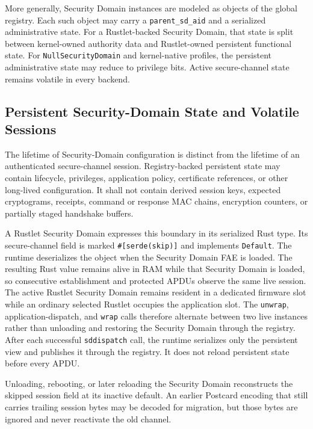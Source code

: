 More generally, Security Domain instances are modeled as objects of the global
registry. Each such object may carry a \texttt{parent\_sd\_aid} and a
serialized administrative state. For a Rustlet-backed Security Domain, that
state is split between kernel-owned authority data and Rustlet-owned persistent
functional state. For \texttt{NullSecurityDomain} and kernel-native profiles,
the persistent administrative state may reduce to privilege bits. Active
secure-channel state remains volatile in every backend.

\subsection{Persistent Security-Domain State and Volatile Sessions}
\label{sec:impl-scp-state-lifetime}

The lifetime of Security-Domain configuration is distinct from the lifetime of
an authenticated secure-channel session. Registry-backed persistent state may
contain lifecycle, privileges, application policy, certificate references, or
other long-lived configuration. It shall not contain derived session keys,
expected cryptograms, receipts, command or response MAC chains, encryption
counters, or partially staged handshake buffers.

A Rustlet Security Domain expresses this boundary in its serialized Rust type.
Its secure-channel field is marked \texttt{\#[serde(skip)]} and implements
\texttt{Default}. The runtime deserializes the object when the Security Domain
FAE is loaded. The resulting Rust value remains alive in RAM while that
Security Domain is loaded, so consecutive establishment and protected APDUs
observe the same live session. The active Rustlet Security Domain remains
resident in a dedicated firmware slot while an ordinary selected Rustlet
occupies the application slot. The \texttt{unwrap}, application-dispatch, and
\texttt{wrap} calls therefore alternate between two live instances rather than
unloading and restoring the Security Domain through the registry. After each
successful \texttt{sddispatch} call, the runtime serializes only the persistent
view and publishes it through the registry. It does not reload persistent state
before every APDU.

Unloading, rebooting, or later reloading the Security Domain reconstructs the
skipped session field at its inactive default. An earlier Postcard encoding
that still carries trailing session bytes may be decoded for migration, but
those bytes are ignored and never reactivate the old channel.

